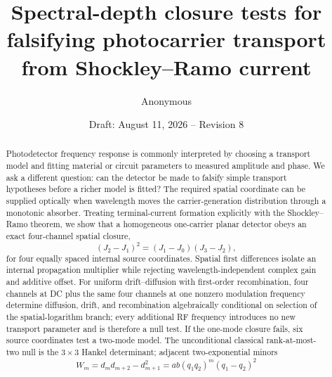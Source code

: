 \documentclass[11pt]{article}
\title{Spectral-depth closure tests for falsifying photocarrier transport from Shockley--Ramo current}
\author{Anonymous}
\date{Draft: August 11, 2026 -- Revision 8}
\begin{document}
\maketitle

\begin{abstract}
Photodetector frequency response is commonly interpreted by choosing a transport model and fitting material or circuit parameters to measured amplitude and phase. We ask a different question: can the detector be made to falsify simple transport hypotheses before a richer model is fitted? The required spatial coordinate can be supplied optically when wavelength moves the carrier-generation distribution through a monotonic absorber. Treating terminal-current formation explicitly with the Shockley--Ramo theorem, we show that a homogeneous one-carrier planar detector obeys an exact four-channel spatial closure,
\begin{equation*}
(J_2-J_1)^2=(J_1-J_0)(J_3-J_2),
\end{equation*}
for four equally spaced internal source coordinates. Spatial first differences isolate an internal propagation multiplier while rejecting wavelength-independent complex gain and additive offset. For uniform drift--diffusion with first-order recombination, four channels at DC plus the same four channels at one nonzero modulation frequency determine diffusion, drift, and recombination algebraically conditional on selection of the spatial-logarithm branch; every additional RF frequency introduces no new transport parameter and is therefore a null test. If the one-mode closure fails, six source coordinates test a two-mode model. The unconditional classical rank-at-most-two null is the $3\times3$ Hankel determinant; adjacent two-exponential minors
\begin{equation*}
W_m=d_m d_{m+2}-d_{m+1}^2
=ab(q_1q_2)^m(q_1-q_2)^2
\end{equation*}

\end{abstract}
\end{document}
